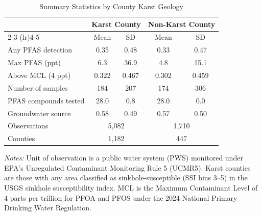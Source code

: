 \begin{table}[htbp]
\centering
\begin{threeparttable}
\caption{Summary Statistics by County Karst Geology}
\label{tab:summary}
\begin{tabular}{lcccc}
\toprule
 & \multicolumn{2}{c}{Karst County} & \multicolumn{2}{c}{Non-Karst County} \\
\cmidrule(lr){2-3} \cmidrule(lr){4-5}
 & Mean & SD & Mean & SD \\
\midrule
Any PFAS detection & 0.35 & 0.48 & 0.33 & 0.47 \\
Max PFAS (ppt) & 6.3 & 36.9 & 4.8 & 15.1 \\
Above MCL (4 ppt) & 0.322 & 0.467 & 0.302 & 0.459 \\
Number of samples & 184 & 207 & 174 & 306 \\
PFAS compounds tested & 28.0 & 0.8 & 28.0 & 0.0 \\
Groundwater source & 0.58 & 0.49 & 0.57 & 0.50 \\
\midrule
Observations & \multicolumn{2}{c}{5,082} & \multicolumn{2}{c}{1,710} \\
Counties & \multicolumn{2}{c}{1,182} & \multicolumn{2}{c}{447} \\
\bottomrule
\end{tabular}
\begin{tablenotes}[flushleft]
\small
\item \textit{Notes:} Unit of observation is a public water system (PWS) monitored under EPA's Unregulated Contaminant Monitoring Rule 5 (UCMR5). Karst counties are those with any area classified as sinkhole-susceptible (SSI bins 3--5) in the USGS sinkhole susceptibility index. MCL is the Maximum Contaminant Level of 4 parts per trillion for PFOA and PFOS under the 2024 National Primary Drinking Water Regulation.
\end{tablenotes}
\end{threeparttable}
\end{table}
